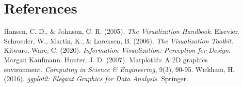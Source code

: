 \documentclass[11pt]{article}
\begin{document}
	\section{References}
	
	\begin{thebibliography}{9}
		 Hansen, C. D., \& Johnson, C. R. (2005). \textit{The Visualization Handbook}. Elsevier.
		 Schroeder, W., Martin, K., \& Lorensen, B. (2006). \textit{The Visualization Toolkit}. Kitware.
		 Ware, C. (2020). \textit{Information Visualization: Perception for Design}. Morgan Kaufmann.
		 Hunter, J. D. (2007). Matplotlib: A 2D graphics environment. \textit{Computing in Science \& Engineering}, 9(3), 90-95.
		 Wickham, H. (2016). \textit{ggplot2: Elegant Graphics for Data Analysis}. Springer.
	\end{thebibliography}
	
\end{document}
